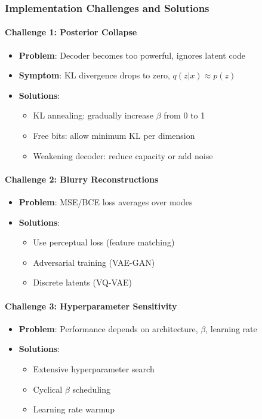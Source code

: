 \documentclass[conference]{IEEEtran}
\begin{document}
\subsubsection{Implementation Challenges and Solutions}

\paragraph{Challenge 1: Posterior Collapse}
\begin{itemize}
    \item \textbf{Problem}: Decoder becomes too powerful, ignores latent code
    \item \textbf{Symptom}: KL divergence drops to zero, $q(z|x) \approx p(z)$
    \item \textbf{Solutions}: 
    \begin{itemize}
        \item KL annealing: gradually increase $\beta$ from 0 to 1
        \item Free bits: allow minimum KL per dimension
        \item Weakening decoder: reduce capacity or add noise
    \end{itemize}
\end{itemize}

\paragraph{Challenge 2: Blurry Reconstructions}
\begin{itemize}
    \item \textbf{Problem}: MSE/BCE loss averages over modes
    \item \textbf{Solutions}:
    \begin{itemize}
        \item Use perceptual loss (feature matching)
        \item Adversarial training (VAE-GAN)
        \item Discrete latents (VQ-VAE)
    \end{itemize}
\end{itemize}

\paragraph{Challenge 3: Hyperparameter Sensitivity}
\begin{itemize}
    \item \textbf{Problem}: Performance depends on architecture, $\beta$, learning rate
    \item \textbf{Solutions}:
    \begin{itemize}
        \item Extensive hyperparameter search
        \item Cyclical $\beta$ scheduling
        \item Learning rate warmup
    \end{itemize}
\end{itemize}
\end{document}

